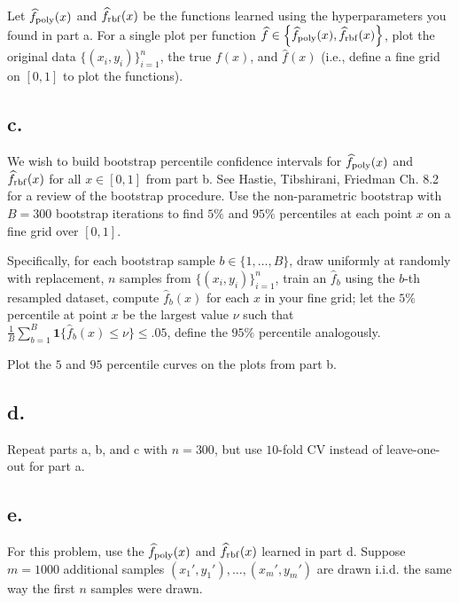 \documentclass{article}
\newcommand{\1}{\mathbf{1}}
\begin{document}
{Let $\widehat{f}_{\rm poly}(x)$ and $\widehat{f}_{\rm rbf}(x)$ be the functions learned using the hyperparameters you found in part a.
  For a single plot per function $\widehat{f} \in \left\lbrace \widehat{f}_{\rm poly}(x), \widehat{f}_{\rm rbf}(x) \right\rbrace$, plot the original data $\{(x_i,y_i)\}_{i=1}^n$, the true $f(x)$, and $\widehat{f}(x)$ (i.e., define a fine grid on $[0,1]$ to plot the functions).

\subsection*{c.}

We wish to build bootstrap percentile confidence intervals for $\widehat{f}_{\rm poly}(x)$ and $\widehat{f}_{\rm rbf}(x)$ for all $x \in [0,1]$ from part b. See Hastie, Tibshirani, Friedman Ch. 8.2 for a review of the bootstrap procedure.
  Use the non-parametric bootstrap with $B=300$ bootstrap iterations to find $5\%$ and $95\%$ percentiles at each point $x$ on a fine grid over $[0,1]$.
  
  \medskip
  
  Specifically, for each bootstrap sample $b \in \{1,\dots,B\}$, draw uniformly at randomly with replacement, $n$ samples from $\{(x_i,y_i)\}_{i=1}^n$, train an $\widehat{f}_b$ using the $b$-th resampled dataset, compute $\widehat{f}_b(x)$ for each $x$ in your fine grid; let the $5\%$ percentile at point $x$ be the largest value $\nu$ such that $\frac{1}{B} \sum_{b=1}^B \1\{ \widehat{f}_b(x) \leq \nu \} \leq .05$, define the $95\%$ percentile analogously. 
  
  \medskip
  
  Plot the $5$ and $95$ percentile curves on the plots from part b.

\subsection*{d.}

Repeat parts a, b, and c with $n=300$, but use $10$-fold CV instead of leave-one-out for part a.

\subsection*{e.}

For this problem, use the $\widehat{f}_{\rm poly}(x)$ and $\widehat{f}_{\rm rbf}(x)$ learned in part d. Suppose $m=1000$ additional samples $(x_1',y_1'),\dots,(x_m',y_m')$ are drawn i.i.d. the same way the first $n$ samples were drawn. 
  
}
\end{document}
